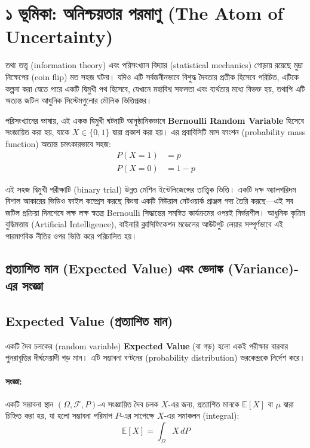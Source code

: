 \documentclass[12pt]{article}
\newcommand{\purplehighlight}[1]{\textcolor{purplehl}{\textbf{#1}}}
\begin{document}
\newpage
\section*{১ ভূমিকা: অনিশ্চয়তার পরমাণু (The Atom of Uncertainty)}
তথ্য তত্ত্ব (information theory) এবং পরিসংখ্যান বিদ্যার (statistical mechanics) গোড়ায় রয়েছে মুদ্রা নিক্ষেপের (coin flip) মত সহজ ঘটনা। যদিও এটি সর্বজনীনভাবে বিশুদ্ধ দৈবতার প্রতীক হিসেবে পরিচিত, এটিকে কল্পনা করা যেতে পারে একটি দ্বিমুখী পথ হিসেবে, যেখানে মহাবিশ্ব সফলতা এবং ব্যর্থতার মধ্যে বিভক্ত হয়, তথাপি এটি অত্যন্ত জটিল আধুনিক সিস্টেমগুলোর মৌলিক ভিত্তিপ্রস্তর।

পরিসংখ্যানের ভাষায়, এই একক দ্বিমুখী ঘটনাটি আনুষ্ঠানিকভাবে \purplehighlight{Bernoulli Random Variable} হিসেবে সংজ্ঞায়িত করা হয়, যাকে $X \in \{0, 1\}$ দ্বারা প্রকাশ করা হয়। এর প্রবাবিলিটি মাস ফাংশন (probability mass function) অত্যন্ত চমৎকারভাবে সহজ:
\begin{align*}
P(X = 1) &= p \\
P(X = 0) &= 1 - p
\end{align*}

এই সহজ দ্বিমুখী পরীক্ষাটি (binary trial) উন্নত মেশিন ইন্টেলিজেন্সের তাত্ত্বিক ভিত্তি। একটি দক্ষ অ্যালগরিদম বিশাল আকারের ভিডিও ফাইল কম্প্রেস করছে কিংবা একটি নিউরাল নেটওয়ার্ক প্রাঞ্জল গদ্য তৈরি করছে—এই সব জটিল প্রক্রিয়া দিনশেষে লক্ষ লক্ষ স্বতন্ত্র Bernoulli সিদ্ধান্তের সমন্বিত কার্যক্রমের ওপরই নির্ভরশীল। আধুনিক কৃত্রিম বুদ্ধিমত্তায় (Artificial Intelligence), বাইনারি ক্লাসিফিকেশন মডেলের আউটপুট লেয়ার সম্পূর্ণভাবে এই পারমাণবিক নীতির ওপর ভিত্তি করে পরিচালিত হয়।


\subsection*{প্রত্যাশিত মান (Expected Value) এবং ভেদাঙ্ক (Variance)-এর সংজ্ঞা}

\subsection*{Expected Value (প্রত্যাশিত মান)}

একটি দৈব চলকের (random variable) \textbf{Expected Value} (বা গড়) হলো একই পরীক্ষার বারবার পুনরাবৃত্তির দীর্ঘমেয়াদী গড় মান। এটি সম্ভাবনা বণ্টনের (probability distribution) ভরকেন্দ্রকে নির্দেশ করে।

\paragraph{সংজ্ঞা:}
একটি সম্ভাবনা স্থান $(\Omega, \mathcal{F}, P)$-এ সংজ্ঞায়িত দৈব চলক $X$-এর জন্য, প্রত্যাশিত মানকে $\mathbb{E}[X]$ বা $\mu$ দ্বারা চিহ্নিত করা হয়, যা হলো সম্ভাবনা পরিমাপ $P$-এর সাপেক্ষে $X$-এর সমাকলন (integral):
\[
\mathbb{E}[X] = \int_{\Omega} X \, dP
\]
\end{document}
